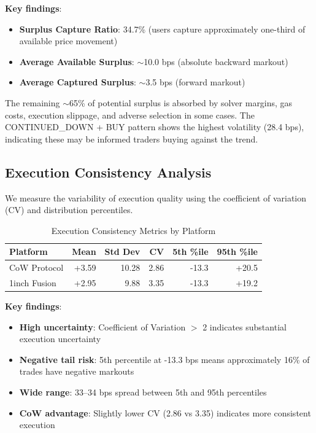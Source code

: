 \documentclass[12pt,a4paper]{article}
\begin{document}
\textbf{Key findings}:
\begin{itemize}
    \item \textbf{Surplus Capture Ratio}: 34.7\% (users capture approximately one-third of available price movement)
    \item \textbf{Average Available Surplus}: $\sim$10.0 bps (absolute backward markout)
    \item \textbf{Average Captured Surplus}: $\sim$3.5 bps (forward markout)
\end{itemize}

The remaining $\sim$65\% of potential surplus is absorbed by solver margins, gas costs, execution slippage, and adverse selection in some cases. The CONTINUED\_DOWN + BUY pattern shows the highest volatility (28.4 bps), indicating these may be informed traders buying against the trend.

\subsection{Execution Consistency Analysis}

We measure the variability of execution quality using the coefficient of variation (CV) and distribution percentiles.

\begin{table}[H]
\centering
\caption{Execution Consistency Metrics by Platform}
\label{tab:consistency}
\begin{tabular}{lrrrrr}
\toprule
\textbf{Platform} & \textbf{Mean} & \textbf{Std Dev} & \textbf{CV} & \textbf{5th \%ile} & \textbf{95th \%ile} \\
\midrule
CoW Protocol & +3.59 & 10.28 & 2.86 & -13.3 & +20.5 \\
1inch Fusion & +2.95 & 9.88 & 3.35 & -13.3 & +19.2 \\
\bottomrule
\end{tabular}
\end{table}

\textbf{Key findings}:
\begin{itemize}
    \item \textbf{High uncertainty}: Coefficient of Variation $>$ 2 indicates substantial execution uncertainty
    \item \textbf{Negative tail risk}: 5th percentile at -13.3 bps means approximately 16\% of trades have negative markouts
    \item \textbf{Wide range}: 33--34 bps spread between 5th and 95th percentiles
    \item \textbf{CoW advantage}: Slightly lower CV (2.86 vs 3.35) indicates more consistent execution
\end{itemize}
\end{document}
